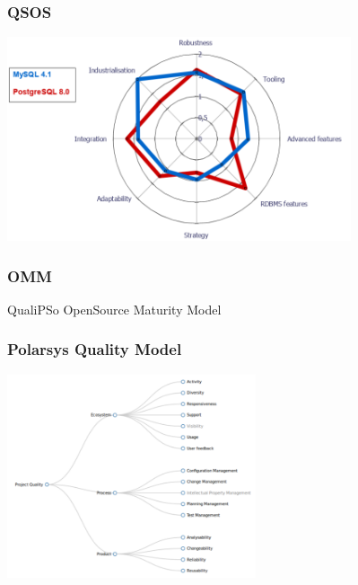 \documentclass[17pt,aspectratio=169,hyperref=pdfusetitle]{beamer}
\begin{document}
\begin{frame}[fragile]
  \frametitle{QSOS}

  \begin{center}
  \includegraphics[height=6cm]{figs/qsos-example}
  \end{center}  

\end{frame}

\begin{frame}[fragile]
  \frametitle{OMM}

  QualiPSo OpenSource Maturity Model
\end{frame}


\begin{frame}[fragile]
  \frametitle{Polarsys Quality Model}

  \begin{center}
  \includegraphics[height=6cm]{figs/polarsys-attributes}
  \end{center}  
  
\end{frame}
\end{document}
